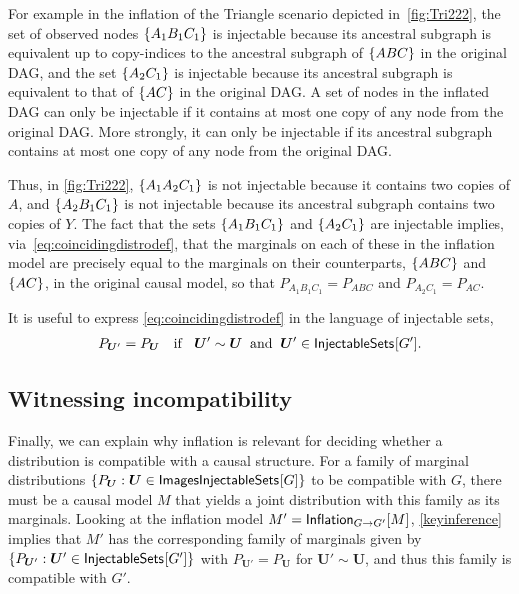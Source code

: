 For example in the inflation of the Triangle scenario depicted in~\cref{fig:Tri222}, the set of observed nodes $\brackets{A_1 B_1 C_1}$ is injectable because its ancestral subgraph is equivalent up to copy-indices to the ancestral subgraph of $\brackets{A B C}$ in the original DAG, and the set $\brackets{A_2 C_1}$ is injectable because its ancestral subgraph is equivalent to that of $\brackets{ A C}$ in the original DAG. A set of nodes in the inflated DAG can only be injectable if it contains at most one copy of any node from the original DAG. More strongly, it can only be injectable if its ancestral subgraph contains at most one copy of any node from the original DAG.  

Thus, in \cref{fig:Tri222}, $\brackets{A_1 A_2 C_1}$ is not injectable because it contains two copies of $A$, and $\brackets{A_2 B_1 C_1}$ is not injectable because its ancestral subgraph contains two copies of $Y$. The fact that the sets $\brackets{A_1 B_1 C_1}$ and $\brackets{A_2 C_1}$ are injectable implies, via~\cref{eq:coincidingdistrodef}, that the marginals on each of these in the inflation model are precisely equal to the marginals on their counterparts, $\brackets{A B C}$ and $\brackets{A C}$, in the original causal model, so that $P_{A_1 B_1 C_1} = P_{A B C}$ and $P_{A_2 C_1} = P_{A C}$.

It is useful to express \cref{eq:coincidingdistrodef} in the language of injectable sets,
\begin{align}\label{keyinference}
P_{\bm{U}'}=P_{\bm{U}}\quad\text{if }  \;\; \bm{U}' \sim \bm{U}\;\; \text{and} \;\; \bm{U}'\in\SmallNamedFunction{InjectableSets}{G'}.%
\end{align}

\subsection{Witnessing incompatibility\label{subsec:witnessingincompat}}

Finally, we can explain why inflation is relevant for deciding whether a distribution is compatible with a causal structure.  For a family of marginal distributions $\{ P_{\bm{U}} : \bm{U} \in \SmallNamedFunction{ImagesInjectableSets}{G}\}$ to be compatible with $G$, there must be a causal model $M$ that yields a joint distribution with this family as its marginals. Looking at the inflation model $M' = \SmallNamedFunction[G\to G']{Inflation}{M}$, \cref{keyinference} implies that $M'$ has the corresponding family of marginals given by $\{ P_{\bm{U}'} : \bm{U}' \in \SmallNamedFunction{InjectableSets}{G'}\}$ with $P_{\bm{U}'} = P_{\bm{U}}$ for $\bm{U}'\sim\bm{U}$, and thus this family is compatible with $G'$.

